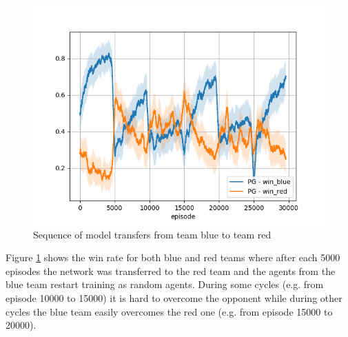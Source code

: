 \begin{figure}[htp]
    \centering
    \includegraphics[width=14cm]{images/iteration/iterative.png}
    \caption{Sequence of model transfers from team blue to team red}
    \label{fig:iteration}
\end{figure}
Figure \ref{fig:iteration} shows the win rate for both blue and red teams where after each 5000 episodes the network was transferred to the red team and the agents from the blue team restart training as random agents. During some cycles (e.g. from episode 10000 to 15000) it is hard to overcome the opponent while during other cycles the blue team easily overcomes the red one (e.g. from episode 15000 to 20000).



